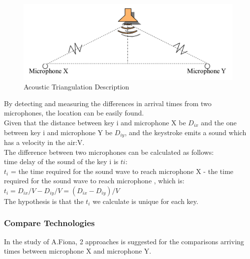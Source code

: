 \documentclass[12pt,a4paper]{article}
\begin{document}
\begin{figure}[h]
\begin{center}
        \includegraphics[scale=0.45]{triAng.png}
        \caption{Acoustic Triangulation Description}
        \label{fig:9}
\end{center}
\end{figure} \par
\FloatBarrier

By detecting and measuring the differences in arrival times from two microphones, the location can be easily found. \\

Given that the distance between key i and microphone X be $D_{ix}$ and the one between key i and microphone Y be $D_{iy}$, and the keystroke emits a sound which has a velocity in the air:V.\\

The difference between two microphones can be calculated as follows: \\

time delay of the sound of the key i is $t{i}$:\\

$t_{i}$ =  the time required for the sound wave to reach microphone X - the time required for the sound wave to reach microphone , which is:\\

$t_{i} = D_{ix}/V - D_{iy}/V = (D_{ix}-D_{iy})/V$\\

The hypothesis is that the $t_{i}$ we calculate is unique for each key.\\

\subsubsection{Compare Technologies}

In the study of A.Fiona, 2 approaches is suggested for the comparisons arriving times between microphone X and microphone Y. \\
\end{document}
